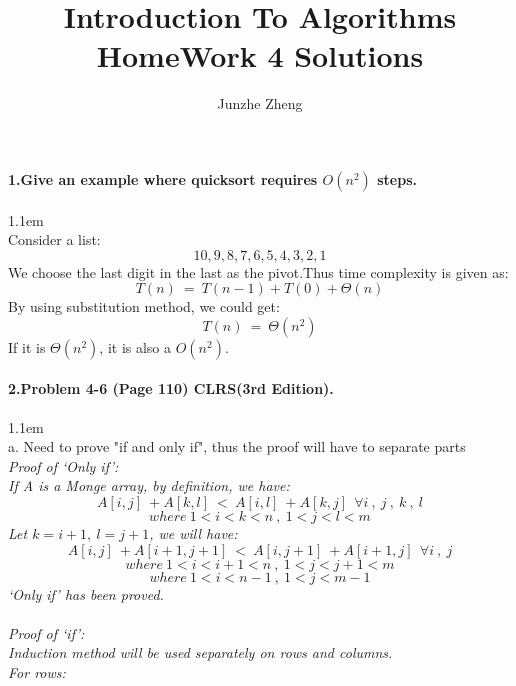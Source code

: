 \documentclass[11pt]{article}
\title{Introduction To Algorithms \\ HomeWork 4 Solutions}
\author{Junzhe Zheng}
\begin{document}
\maketitle

\paragraph{1.Give an example where quicksort requires $O(n^{2})$ steps.}
\hangindent 1.1em
\noindent
\\Consider a list:
\[
	10,9,8,7,6,5,4,3,2,1
\]
We choose the last digit in the last as the pivot.Thus time complexity is given as:
\[
	T(n)\ =\ T(n-1)+T(0)+\Theta(n)
\]
By using substitution method, we could get:
\[
	T(n)\ =\ \Theta(n^{2})
\]
If it is $\Theta(n^{2})$, it is also a $O(n^{2})$.
\\
\paragraph{2.Problem 4-6 (Page 110) CLRS(3rd Edition).}
\hangindent 1.1em
\noindent
\\a. Need to prove "if and only if", thus the proof will have to separate parts
\\\it{ Proof of `Only if'}\normalfont:
\\If A is a Monge array, by definition, we have:
$$A[i,j]\ +A[k,l]\ <\ A[i,l]\ +A[k,j]\ \ \forall i\ ,\ j\ ,\ k\ ,\ l$$
$$where\ 1<i<k<n\ ,\ 1<j<l<m$$
Let $k=i+1,\ l=j+1$, we will have:
$$A[i,j]\ +A[i+1,j+1]\ <\ A[i,j+1]\ +A[i+1,j]\ \ \forall i\ ,\ j$$
$$where\ 1<i<i+1<n\ ,\ 1<j<j+1<m$$
$$where\ 1<i<n-1\ ,\ 1<j<m-1$$
`Only if' has been proved.
\\
\\\it{Proof of `if'}\normalfont:
\\Induction method will be used separately on rows and columns.
\\For rows:
\\
\end{document}

